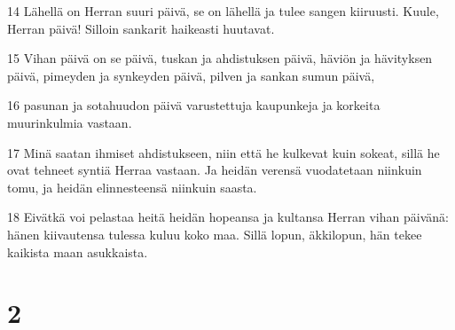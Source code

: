 \par 14 Lähellä on Herran suuri päivä, se on lähellä ja tulee sangen kiiruusti. Kuule, Herran päivä! Silloin sankarit haikeasti huutavat.
\par 15 Vihan päivä on se päivä, tuskan ja ahdistuksen päivä, häviön ja hävityksen päivä, pimeyden ja synkeyden päivä, pilven ja sankan sumun päivä,
\par 16 pasunan ja sotahuudon päivä varustettuja kaupunkeja ja korkeita muurinkulmia vastaan.
\par 17 Minä saatan ihmiset ahdistukseen, niin että he kulkevat kuin sokeat, sillä he ovat tehneet syntiä Herraa vastaan. Ja heidän verensä vuodatetaan niinkuin tomu, ja heidän elinnesteensä niinkuin saasta.
\par 18 Eivätkä voi pelastaa heitä heidän hopeansa ja kultansa Herran vihan päivänä: hänen kiivautensa tulessa kuluu koko maa. Sillä lopun, äkkilopun, hän tekee kaikista maan asukkaista.

\chapter{2}

